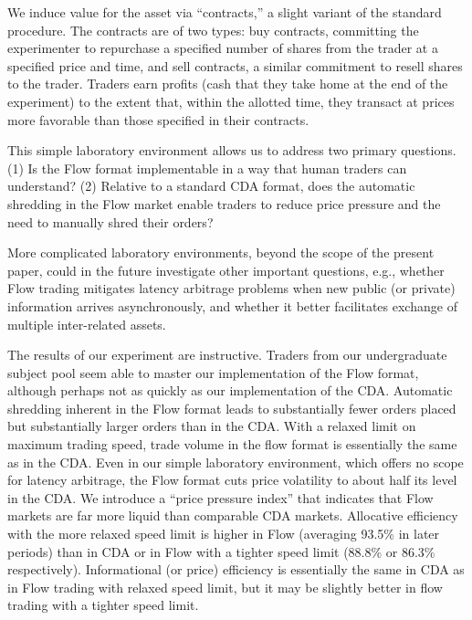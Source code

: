 \documentclass[12pt]{article}
\begin{document}
We induce value for the asset via ``contracts,'' a slight variant of the standard procedure.  
The contracts are of two types: buy contracts, committing the experimenter to repurchase a specified number of shares from the trader at a specified price and time, and sell contracts, a similar commitment to resell shares to the trader. Traders earn profits (cash that they take home at the end of the experiment) to the extent that,
within the allotted time,
they transact at prices more favorable than those specified in their contracts.

This simple laboratory environment allows us to address two primary questions.
(1) Is the Flow format implementable in a way that human traders can understand?
(2) Relative to a standard CDA format, does the automatic   shredding in the Flow market enable traders to reduce price pressure and the need to manually shred their orders?

More complicated laboratory environments, beyond the scope of the present paper, could in the future investigate other important questions, e.g., whether Flow trading mitigates latency arbitrage problems when new public (or private) information arrives asynchronously, and whether
it better facilitates exchange of multiple inter-related assets.

 
 
The results of our experiment are instructive. 
Traders from our undergraduate subject pool seem able to master our implementation of the Flow format, although perhaps not as quickly as our implementation of the CDA. 
Automatic shredding inherent in the Flow format leads to substantially fewer orders placed but substantially larger orders than in the CDA. 
With a relaxed limit on maximum trading speed,  trade volume in the flow format is essentially the same as in the CDA.
Even in our simple laboratory environment, which offers no scope for latency arbitrage, the Flow format cuts price volatility to about half its level in the CDA. 
We introduce a ``price pressure index'' that indicates that Flow markets are far more liquid than comparable CDA markets.
Allocative efficiency with the more relaxed speed limit is
higher in Flow (averaging 93.5\% in later periods) 
than in CDA or in Flow with a tighter speed limit (88.8\% or 86.3\% respectively). 
Informational (or price) efficiency is essentially the same in CDA as in Flow trading with relaxed speed limit, 
but it may be slightly better in flow trading with a tighter speed limit.
\end{document}
